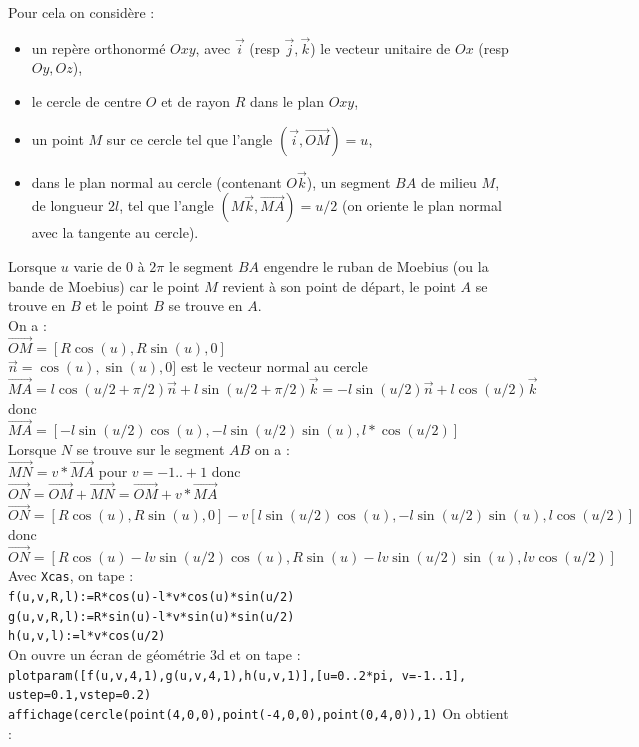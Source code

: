 \documentclass[a4paper,11pt]{book}
\begin{document}
Pour cela on consid\`ere :
\begin{itemize}
\item un rep\`ere orthonorm\'e $Oxy$, avec $\overrightarrow{i}$ (resp 
$\overrightarrow{j}, \overrightarrow{k}$) le vecteur unitaire de $Ox$ (resp 
$Oy,Oz$), 
\item le cercle de centre $O$ et de rayon $R$ dans le plan $Oxy$,
\item un point $M$ sur ce cercle tel que l'angle
$(\overrightarrow{i},\overrightarrow{OM})=u$, 
\item dans le plan normal au cercle (contenant $O\overrightarrow{k}$), un
segment $BA$ de milieu $M$, de longueur $2l$, tel que l'angle 
$(M\overrightarrow{k},\overrightarrow{MA})=u/2$ (on oriente le plan normal 
avec la tangente au cercle).
\end{itemize}
Lorsque $u$ varie de 0 \`a $2\pi$ le segment $BA$ engendre le ruban de Moebius 
(ou la bande de Moebius) car le point $M$ revient \`a son point de d\'epart, le
point $A$ se trouve en $B$ et  le point $B$ se trouve en $A$.\\
On a :\\ 
$\overrightarrow{OM}=[R\cos(u),R\sin(u),0]$\\
$\overrightarrow{n}=\cos(u),\sin(u),0]$ est le vecteur normal au cercle\\
$\overrightarrow{MA}=l \cos(u/2+\pi/2)\overrightarrow{n}+l\sin(u/2+\pi/2)\overrightarrow{k}=-l\sin(u/2)\overrightarrow{n}+l\cos(u/2)\overrightarrow{k}$\\
donc \\
$\overrightarrow{MA}=[-l\sin(u/2)\cos(u),-l \sin(u/2)\sin(u),l*\cos(u/2)]$\\
Lorsque $N$ se trouve sur le segment $AB$ on a :\\
$\overrightarrow{MN}=v*\overrightarrow{MA}$ pour  $v=-1..+1$ donc \\
$\overrightarrow{ON}=\overrightarrow{OM}+\overrightarrow{MN}=\overrightarrow{OM}+v*\overrightarrow{MA}$\\
$\overrightarrow{ON}=[R\cos(u),R \sin(u),0]-v[l \sin(u/2)\cos(u),-l \sin(u/2)\sin(u),l \cos(u/2)]$\\
donc \\
$\overrightarrow{ON}=[R\cos(u)-lv\sin(u/2)\cos(u),R \sin(u)-lv \sin(u/2)\sin(u),lv \cos(u/2)]$\\
Avec {\tt Xcas}, on tape :\\
{\tt f(u,v,R,l):=R*cos(u)-l*v*cos(u)*sin(u/2)}\\
{\tt g(u,v,R,l):=R*sin(u)-l*v*sin(u)*sin(u/2)}\\
{\tt h(u,v,l):=l*v*cos(u/2)}\\
On ouvre un \'ecran de g\'eom\'etrie 3d et on tape :\\
{\tt plotparam([f(u,v,4,1),g(u,v,4,1),h(u,v,1)],[u=0..2*pi, v=-1..1], ustep=0.1,vstep=0.2)}\\
{\tt affichage(cercle(point(4,0,0),point(-4,0,0),point(0,4,0)),1)}
On obtient :\\
\end{document}
